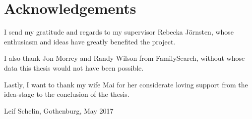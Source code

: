 \thispagestyle{plain} %
\section*{Acknowledgements}

I send my gratitude and regards to my supervisor Rebecka Jörnsten, whose enthusiasm and ideas have greatly benefited the project.

I also thank Jon Morrey and Randy Wilson from FamilySearch, without whose data this thesis would not have been possible.

Lastly, I want to thank my wife Mai for her considerate loving support from the idea-stage to the conclusion of the thesis.

\vspace{1.5cm}
\hfill
Leif Schelin, Gothenburg, May 2017

\newpage
\thispagestyle{empty}
\mbox{}
